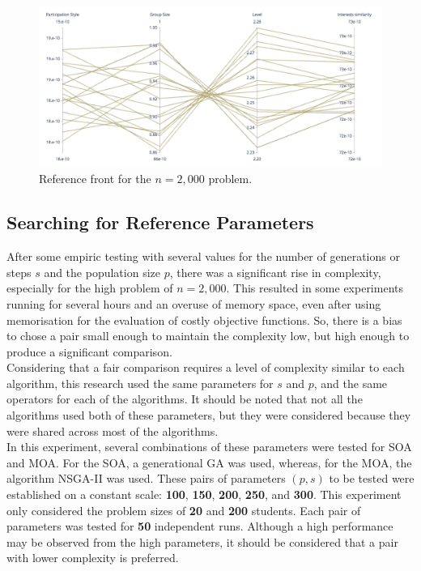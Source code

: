 \begin{figure}[H]
    \centering
    \includegraphics[width=\textwidth]{images/parallel_ref_2000.png}
    \caption{Reference front for the $n=2,000$ problem. }
    \label{fig:reference_front_2000}
\end{figure}

\subsection{Searching for Reference Parameters}
\label{sub:section_ref_params}

After some empiric testing with several values for the number of generations or steps $s$ and the population size $p$, there was a significant rise in complexity, especially for the high problem of $n=2,000$. This resulted in some experiments running for several hours and an overuse of memory space, even after using memorisation for the evaluation of costly objective functions. So, there is a bias to chose a pair small enough to maintain the complexity low, but high enough to produce a significant comparison.\\

Considering that a fair comparison requires a level of complexity similar to each algorithm, this research used the same parameters for $s$ and $p$, and the same operators for each of the algorithms. It should be noted that not all the algorithms used both of these parameters, but they were considered because they were shared across most of the algorithms.\\

In this experiment, several combinations of these parameters were tested for SOA and MOA. For the SOA, a generational GA was used, whereas, for the MOA, the algorithm NSGA-II was used. These pairs of parameters $(p,s)$ to be tested were established on a constant scale: \textbf{100}, \textbf{150}, \textbf{200}, \textbf{250}, and \textbf{300}. This experiment only considered the problem sizes of \textbf{20} and \textbf{200} students. Each pair of parameters was tested for \textbf{50} independent runs. Although a high performance may be observed from the high parameters, it should be considered that a pair with lower complexity is preferred.\\

